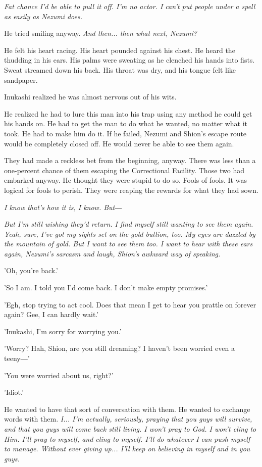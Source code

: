 \emph{Fat chance I'd be able to pull it off. I'm no actor. I can't put people
under a spell as easily as Nezumi does.}

He tried smiling anyway. \emph{And then... then what next, Nezumi?}

He felt his heart racing. His heart pounded against his chest. He heard
the thudding in his ears. His palms were sweating as he clenched his
hands into fists. Sweat streamed down his back. His throat was dry, and
his tongue felt like sandpaper.

Inukashi realized he was almost nervous out of his wits.

He realized he had to lure this man into his trap using any method he
could get his hands on. He had to get the man to do what he wanted, no
matter what it took. He had to make him do it. If he failed, Nezumi and
Shion's escape route would be completely closed off. He would never be
able to see them again.

They had made a reckless bet from the beginning, anyway. There was less
than a one-percent chance of them escaping the Correctional Facility.
Those two had embarked anyway. He thought they were stupid to do so.
Fools of fools. It was logical for fools to perish. They were reaping
the rewards for what they had sown.

\emph{I know that's how it is, I know. But―}

\emph{But I'm still wishing they'd return. I find myself still wanting to see
them again. Yeah, sure, I've got my sights set on the gold bullion, too.
My eyes are dazzled by the mountain of gold. But I want to see them too.
I want to hear with these ears again, Nezumi's sarcasm and laugh,
Shion's awkward way of speaking.}

'Oh, you're back.'

'So I am. I told you I'd come back. I don't make empty promises.'

'Egh, stop trying to act cool. Does that mean I get to hear you prattle
on forever again? Gee, I can hardly wait.'

'Inukashi, I'm sorry for worrying you.'

'Worry? Hah, Shion, are you still dreaming? I haven't been worried even
a teeny―'

'You were worried about us, right?'

'Idiot.'

He wanted to have that sort of conversation with them. He wanted to
exchange words with them. \emph{I... I'm actually, seriously, praying that you
guys will survive, and that you guys will come back still living. I
won't pray to God. I won't cling to Him. I'll pray to myself, and cling
to myself. I'll do whatever I can push myself to manage. Without ever
giving up... I'll keep on believing in myself and in you guys.}

